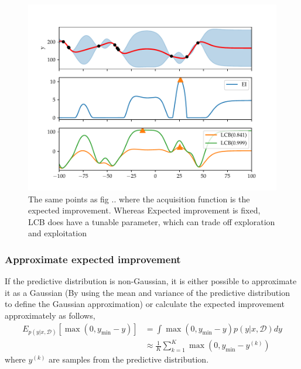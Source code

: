 \begin{figure}
    \centering
    \includegraphics[width=\textwidth]{Pictures/illustration_AQs.pdf}
    \caption{The same points as fig .. where the acquisition function is the
    expected improvement. Whereas Expected improvement is fixed, LCB does have a tunable parameter, which can trade off 
    exploration and exploitation }
\end{figure}

\subsubsection{Approximate expected improvement}
If the predictive distribution is non-Gaussian, it is either possible to approximate it as a Gaussian
(By using the mean and variance of the predictive distribution to define the Gaussian approximation)
or calculate the expected improvement approximately as follows, 
\begin{align*}
    E_{p(y|x,\mathcal{D})}[\max(0,y_{\min}-y)] &= \int \max(0,y_{\min}-y) p(y|x,\mathcal{D}) dy\\
    &\approx \frac{1}{K} \sum_{k=1}^K  \max(0,y_{\min}-y^{(k)})
\end{align*}
where $y^{(k)}$ are samples from the predictive distribution.

